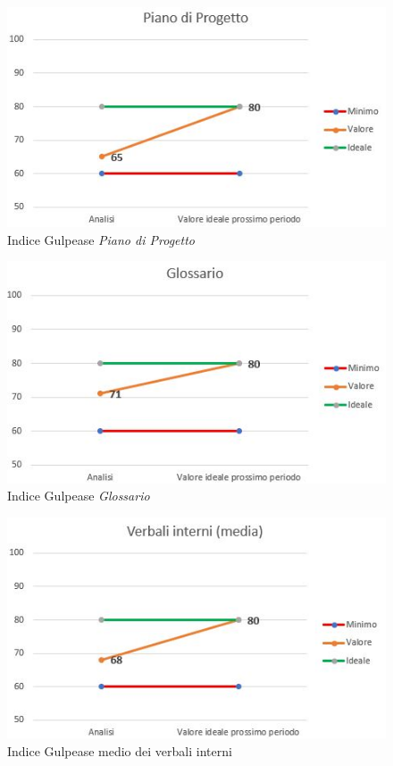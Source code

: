 \begin{figure}
	\centering
	\includegraphics[scale=1]{Images/PianoDiProgetto.JPG}
	\caption{Indice Gulpease \textit{Piano di Progetto}}
\end{figure}

\begin{figure}
	\centering
	\includegraphics[scale=1]{Images/Glossario.JPG}
	\caption{Indice Gulpease \textit{Glossario}}
\end{figure}

\begin{figure}
	\centering
	\includegraphics[scale=1]{Images/VerbaliInterni.JPG}
	\caption{Indice Gulpease medio dei verbali interni}
\end{figure}

